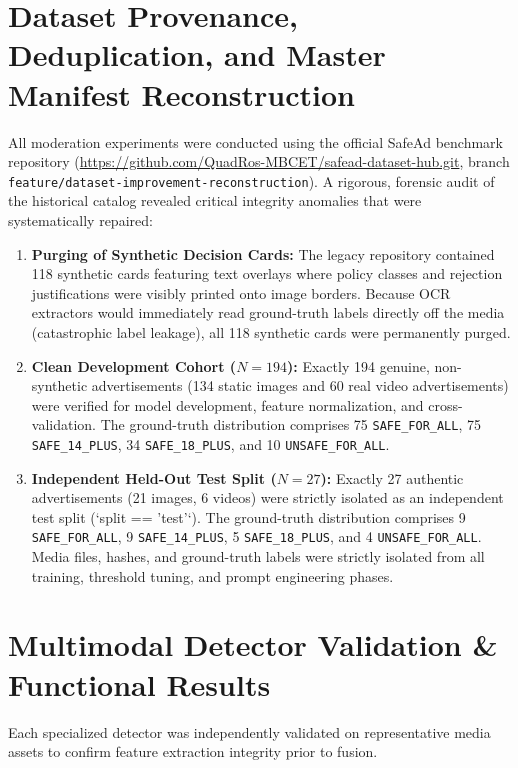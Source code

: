 \documentclass[12pt,a4paper]{report}
\begin{document}
\section{Dataset Provenance, Deduplication, and Master Manifest Reconstruction}

All moderation experiments were conducted using the official SafeAd benchmark repository (\url{https://github.com/QuadRos-MBCET/safead-dataset-hub.git}, branch \texttt{feature/dataset-improvement-reconstruction}). A rigorous, forensic audit of the historical catalog revealed critical integrity anomalies that were systematically repaired:
\begin{enumerate}
    \item \textbf{Purging of Synthetic Decision Cards:} The legacy repository contained 118 synthetic cards featuring text overlays where policy classes and rejection justifications were visibly printed onto image borders. Because OCR extractors would immediately read ground-truth labels directly off the media (catastrophic label leakage), all 118 synthetic cards were permanently purged.
    \item \textbf{Clean Development Cohort ($N=194$):} Exactly 194 genuine, non-synthetic advertisements (134 static images and 60 real video advertisements) were verified for model development, feature normalization, and cross-validation. The ground-truth distribution comprises 75 \texttt{SAFE\_FOR\_ALL}, 75 \texttt{SAFE\_14\_PLUS}, 34 \texttt{SAFE\_18\_PLUS}, and 10 \texttt{UNSAFE\_FOR\_ALL}.
    \item \textbf{Independent Held-Out Test Split ($N=27$):} Exactly 27 authentic advertisements (21 images, 6 videos) were strictly isolated as an independent test split (`split == 'test'`). The ground-truth distribution comprises 9 \texttt{SAFE\_FOR\_ALL}, 9 \texttt{SAFE\_14\_PLUS}, 5 \texttt{SAFE\_18\_PLUS}, and 4 \texttt{UNSAFE\_FOR\_ALL}. Media files, hashes, and ground-truth labels were strictly isolated from all training, threshold tuning, and prompt engineering phases.
\end{enumerate}

\section{Multimodal Detector Validation \& Functional Results}

Each specialized detector was independently validated on representative media assets to confirm feature extraction integrity prior to fusion.
\end{document}
